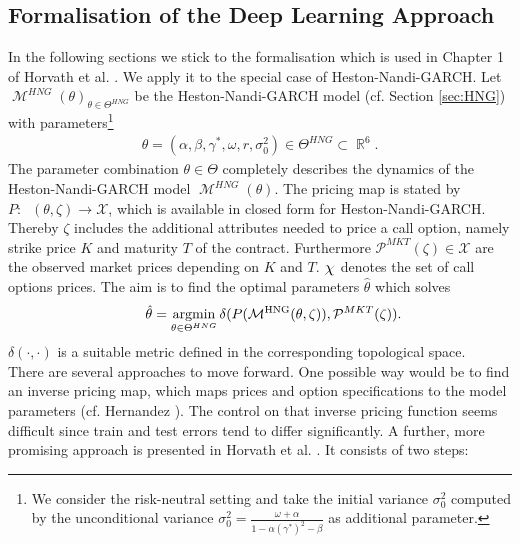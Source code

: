 \documentclass{article}
\DeclareMathOperator{\R}{\mathbb{R}}
\DeclareMathOperator{\M}{\mathcal{M}}
\DeclareMathOperator{\HNG}{\mathcal{M}^{HNG}}
\DeclareMathOperator*{\argmin}{argmin}
\begin{document}
\subsection{Formalisation of the Deep Learning Approach}
In the following sections we stick to the formalisation which is used in Chapter 1 of Horvath et al. \cite{Blanka}. We apply it to the special case of Heston-Nandi-GARCH. \newline 
Let $\M^{HNG}(\theta)_{\theta \in \Theta^{HNG}}$ be the Heston-Nandi-GARCH model (cf. Section \ref{sec:HNG}) with parameters\footnote{We consider the risk-neutral setting and take the initial variance $\sigma_0^2$ computed by the unconditional variance $\sigma_0^2 = \frac{\omega+\alpha}{1-\alpha(\gamma^*)^2-\beta}$ as additional parameter.} 
\begin{align}
\theta = (\alpha, \beta, \gamma^*, \omega, r, \sigma_0^2) \in \Theta^{HNG} \subset \R^6. \label{eq:param}
\end{align} 
The parameter combination $\theta \in \Theta$ completely describes the dynamics of the Heston-Nandi-GARCH model $\M^{HNG}(\theta)$. \newline
The pricing map is stated by $P: \HNG(\theta, \zeta) \to \mathcal{X}$, which is available in closed form for Heston-Nandi-GARCH. Thereby $\zeta$ includes the additional attributes needed to price a call option, namely strike price $K$ and maturity $T$ of the contract. Furthermore $\mathcal{P}^{MKT}(\zeta) \in \mathcal{X}$ are the observed market prices depending on $K$ and $T$. $\mbox{\large$\chi$}$ denotes the set of call options prices. The aim is to find the optimal parameters $\hat{\theta}$ which solves
\begin{align*}
    \hspace{0.7cm}\hat{\theta} = \argmin_{\theta\in \Theta^{HNG}} \delta(P(\HNG(\theta, \zeta)), \mathcal{P}^{MKT}(\zeta)).
\end{align*}
$\delta(\cdot,\cdot)$ is a suitable metric defined in the corresponding topological space. \\
There are several approaches to move forward. One possible way would be to find an inverse pricing map, which maps prices and option specifications to the model parameters (cf. Hernandez \cite{Hernandez}). 
The control on that inverse pricing function seems difficult since train and test errors tend to differ significantly. \newline
A further, more promising approach is presented in Horvath et al. \cite{Blanka}. It consists of two steps:
\end{document}
